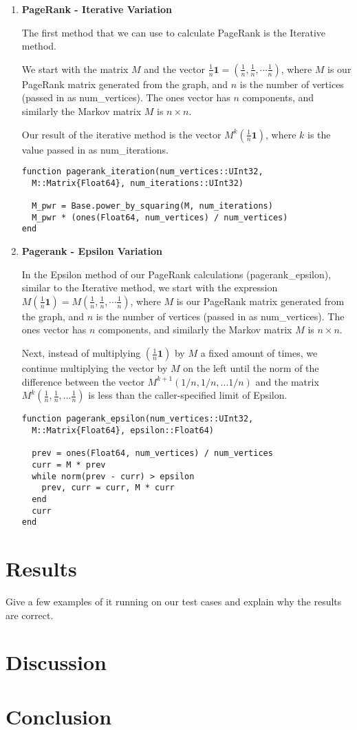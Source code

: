 \documentclass[12pt, titlepage, twoside]{amsart}
\renewcommand{\vec}[1]{\ensuremath{\mathbf{#1}}}
\theoremstyle{remark}
\begin{document}
\begin{enumerate}

\item \textbf{PageRank - Iterative Variation}

The first method that we can use to calculate PageRank is the Iterative method. 


We start with the matrix $M$ and the vector $\frac{1}{n}\vec{1} = (\frac{1}{n}, \frac{1}{n}, \cdots \frac{1}{n})$, where $M$ is our PageRank matrix generated from the graph, and $n$ is the number of vertices (passed in as num\_vertices). The ones vector has $n$ components, and similarly the Markov matrix $M$ is $n\times n$.

Our result of the iterative method is the vector $M^k (\frac{1}{n}\vec{1})$, where $k$ is the value passed in as num\_iterations.

\begin{lstlisting}
function pagerank_iteration(num_vertices::UInt32,
  M::Matrix{Float64}, num_iterations::UInt32)
  
  M_pwr = Base.power_by_squaring(M, num_iterations)
  M_pwr * (ones(Float64, num_vertices) / num_vertices)
end
\end{lstlisting}


\item \textbf{Pagerank - Epsilon Variation}

In the Epsilon method of our PageRank calculations (pagerank\_epsilon), similar to the Iterative method, we start with the expression $M(\frac{1}{n}\vec{1}) = M(\frac{1}{n}, \frac{1}{n}, \cdots \frac{1}{n})$, where $M$ is our PageRank matrix generated from the graph, and $n$ is the number of vertices (passed in as num\_vertices). The ones vector has $n$ components, and similarly the Markov matrix $M$ is $n\times n$.

Next, instead of multiplying $(\frac{1}{n}\vec{1})$ by $M$ a fixed amount of times, we continue multiplying the vector by $M$ on the left until the norm of the difference between the vector $M^{k+1}(1/n, 1/n, ... 1/n)$ and the matrix $M^k(\frac{1}{n}, \frac{1}{n}, ... \frac{1}{n})$ is less than the caller-specified limit of Epsilon.

\begin{lstlisting}
function pagerank_epsilon(num_vertices::UInt32, 
  M::Matrix{Float64}, epsilon::Float64)
  
  prev = ones(Float64, num_vertices) / num_vertices
  curr = M * prev
  while norm(prev - curr) > epsilon
    prev, curr = curr, M * curr
  end
  curr
end
\end{lstlisting}

\end{enumerate}

\section{Results}

Give a few examples of it running on our test cases and explain why the results are correct.

\section{Discussion}


\section{Conclusion}
\end{document}
